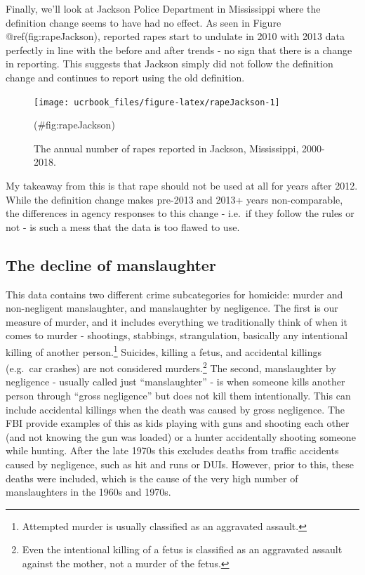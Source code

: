 \documentclass[
  12pt,
  openany]{book}
\begin{document}
Finally, we'll look at Jackson Police Department in Mississippi where the definition change seems to have had no effect. As seen in Figure @ref(fig:rapeJackson), reported rapes start to undulate in 2010 with 2013 data perfectly in line with the before and after trends - no sign that there is a change in reporting. This suggests that Jackson simply did not follow the definition change and continues to report using the old definition.

\begin{figure}

{\centering \texttt{[image: ucrbook\_files/figure-latex/rapeJackson-1]} 

}

\caption{The annual number of rapes reported in Jackson, Mississippi, 2000-2018.}(\#fig:rapeJackson)
\end{figure}

My takeaway from this is that rape should not be used at all for years after 2012. While the definition change makes pre-2013 and 2013+ years non-comparable, the differences in agency responses to this change - i.e.~if they follow the rules or not - is such a mess that the data is too flawed to use.

\hypertarget{the-decline-of-manslaughter}{%
\subsection{The decline of manslaughter}\label{the-decline-of-manslaughter}}

This data contains two different crime subcategories for homicide: murder and non-negligent manslaughter, and manslaughter by negligence. The first is our measure of murder, and it includes everything we traditionally think of when it comes to murder - shootings, stabbings, strangulation, basically any intentional killing of another person.\footnote{Attempted murder is usually classified as an aggravated assault.} Suicides, killing a fetus, and accidental killings (e.g.~car crashes) are not considered murders.\footnote{Even the intentional killing of a fetus is classified as an aggravated assault against the mother, not a murder of the fetus.} The second, manslaughter by negligence - usually called just ``manslaughter'' - is when someone kills another person through ``gross negligence'' but does not kill them intentionally. This can include accidental killings when the death was caused by gross negligence. The FBI provide examples of this as kids playing with guns and shooting each other (and not knowing the gun was loaded) or a hunter accidentally shooting someone while hunting. After the late 1970s this excludes deaths from traffic accidents caused by negligence, such as hit and runs or DUIs. However, prior to this, these deaths were included, which is the cause of the very high number of manslaughters in the 1960s and 1970s.
\end{document}
